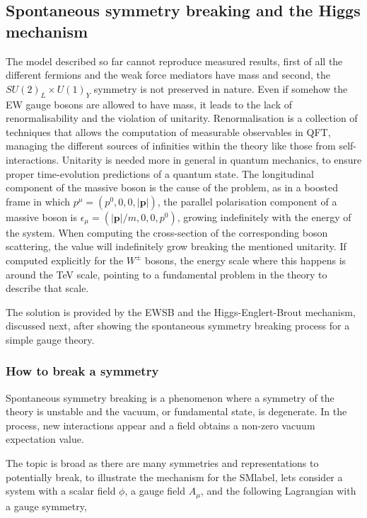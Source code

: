 \subsection{Spontaneous symmetry breaking and the Higgs mechanism}
\label{subsec:SSB}
The model described so far cannot reproduce measured results, first of all the different fermions and the weak force mediators
have mass and second, the $SU(2)_L\times U(1)_Y$ symmetry is not preserved in nature.
Even if somehow the \acrshort{EW} gauge bosons are allowed to have mass, it leads to the lack of renormalisability and the violation of unitarity. Renormalisation is a collection of techniques that allows the computation of measurable observables in \acrshort{QFT}, managing the different sources of infinities within the theory like those from self-interactions.
Unitarity is needed more in general in quantum mechanics, to ensure proper time-evolution predictions of
a quantum state. The longitudinal component of the massive boson is the cause of the problem,
as in a boosted frame in which $p^\mu=(p^0,0,0,|\textbf{p}|)$, the parallel polarisation component of a massive boson is
$\epsilon_\mu=(|\textbf{p}|/m,0,0,p^0)$, growing indefinitely with the energy of the system.
When computing the cross-section of the corresponding boson scattering, the value will indefinitely grow breaking the mentioned unitarity.
If computed explicitly for the $W^\pm$ bosons, the energy scale where this happens is around the TeV scale,
pointing to a fundamental problem in the theory to describe that scale.

The solution is provided by the \acrshort{EWSB} and the Higgs-Englert-Brout mechanism, discussed next, after showing the spontaneous
symmetry breaking process for a simple gauge theory.

\subsubsection{How to break a symmetry}

Spontaneous symmetry breaking is a phenomenon where a symmetry of the theory is unstable and the vacuum, or fundamental state, is degenerate.
In the process, new interactions appear and a field obtains a non-zero vacuum expectation value.

The topic is broad as there are many symmetries and representations to potentially break, to illustrate the mechanism for the \acrshort{SMlabel},
lets consider a system with a scalar field $\phi$, a gauge field $A_\mu$, and the following Lagrangian with a gauge symmetry,

